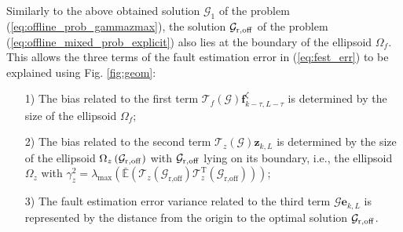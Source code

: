 \documentclass[twocolumn]{autart}
\begin{document}
Similarly to the above obtained solution $\mathcal{G}_1$ of the problem (\ref{eq:offline_prob_gammazmax}), the solution $\mathcal{G}_{\rm{r,off}}$ of the problem (\ref{eq:offline_mixed_prob_explicit}) also lies at the boundary of the ellipsoid $\Omega_f$. This allows the three terms of the fault estimation error in (\ref{eq:fest_err}) to be explained using Fig. \ref{fig:geom}:
\begin{enumerate}
  \item[1)] The bias related to the first term $\mathcal{T}_f \left( \mathcal{G} \right) \mathbf{f}_{k-\tau, L-\tau}^\zeta$ is determined by the size of the ellipsoid $\Omega_f$;
  \item[2)] The bias related to the second term $\mathcal{T}_z \left( \mathcal{G} \right) \mathbf{z}_{k,L}$ is determined by the size of the ellipsoid $\Omega_z \left( \mathcal{G}_{\rm{r,off}} \right)$ with $\mathcal{G}_{\rm{r,off}}$ lying on its boundary, i.e., the ellipsoid $\Omega_z$ with $\gamma_z^2 = \lambda_{\text{max}} \left(\mathbb{\bar E} \left( {\mathcal{T}}_{z} \left( \mathcal{G}_{\text{r,off}} \right) {\mathcal{T}}_{z}^\mathrm{T} \left( \mathcal{G}_{\text{r,off}} \right) \right)\right)$;
  \item[3)] The fault estimation error variance related to the third term $\mathcal{G} \mathbf{e}_{k,L}$  is represented by the distance from the origin to the optimal solution $\mathcal{G}_{\rm{r,off}}$.
\end{enumerate}
\end{document}
